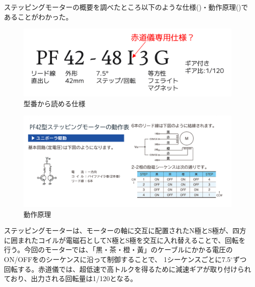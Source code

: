 \documentclass[../../main]{subfiles}
\begin{document}
ステッピングモーターの概要を調べたところ以下のような仕様()・動作原理()であることがわかった。
\begin{figure}[H]
  \centering
  \includegraphics[width=.8\textwidth]{PF42.png}
  \caption{型番から読める仕様}
  \label{fig:PF42}
\end{figure}
\begin{figure}
  \centering
  \includegraphics[width=.8\textwidth]{detail.png}
  \caption{動作原理}
  \label{fig:detail}
\end{figure}
ステッピングモーターは、モーターの軸に交互に配置されたN極とS極が、四方に囲まれたコイルが電磁石としてN極とS極を交互に入れ替えることで、回転を行う。今回のモーターでは、「黒・茶・橙・黃」のケーブルにかかる電圧のON/OFFをのシーケンスに沿って制御することで、
1シーケンスごとに7.5$^\circ$ずつ回転する。赤道儀では、超低速で高トルクを得るために減速ギアが取り付けられており、出力される回転量は1/120となる。
\end{document}
